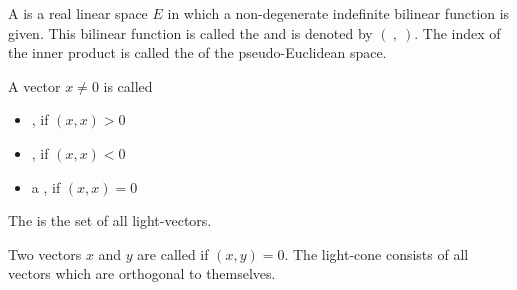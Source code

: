 A  is a real linear space $E$ in which a non-degenerate indefinite bilinear function is given. This bilinear function is called the  and is denoted by $(\ ,\ )$. The index of the inner product is called the  of the pseudo-Euclidean space.

A vector $x \neq 0$ is called
\begin{itemize}
  \item {}, if $(x, x) > 0$
  \item {}, if $(x, x) < 0$
  \item a , if $(x, x) = 0$
\end{itemize}

The  is the set of all light-vectors.

Two vectors $x$ and $y$ are called  if $(x, y) = 0$. The light-cone consists of all vectors which are orthogonal to themselves.
